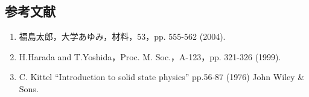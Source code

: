 \documentclass{proceedings}
\begin{document}
\begin{multicols}{2}
        \section*{参考文献}
            \begin{enumerate}
                \item 福島太郎，大学あゆみ，材料，53，pp. 555-562 (2004).
                \item H.Harada and T.Yoshida，Proc. M. Soc.，A-123，pp. 321-326 (1999).
                \item C. Kittel “Introduction to solid state physics” pp.56-87 (1976) John Wiley \& Sons.
            \end{enumerate}

    \end{multicols}
\end{document}
